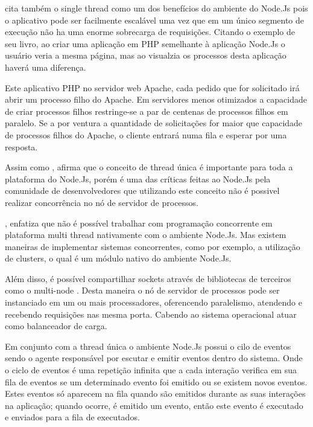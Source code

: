   \cite{Powers:2012} cita também o single thread como um dos benefícios do ambiente do Node.Js 
  pois o aplicativo pode ser facilmente escalável uma vez que em um único segmento de execução não ha uma enorme 
  sobrecarga de requisições. Citando o exemplo de seu livro, ao criar uma aplicação em \ac{PHP} semelhante 
  à aplicação Node.Js o usuário veria a mesma página, mas ao visualzia os processos desta aplicação haverá uma 
  diferença.
  
  Este aplicativo \ac{PHP} no servidor web Apache, cada pedido que for solicitado irá abrir um 
  processo filho do Apache. Em servidores menos otimizados a capacidade de criar processos filhos
  restringe-se a par de centenas de processos filhos em paralelo. Se a por ventura a quantidade de solicitações
  for maior que capacidade de processos filhos do Apache, o cliente entrará numa fila e esperar por uma resposta.\cite{Powers:2012}

  Assim como ,  afirma que o conceito de thread única é importante para 
  toda a plataforma do Node.Js, porém é uma das críticas feitas ao Node.Js pela comunidade de desenvolvedores 
  que utilizando este conceito não é possivel realizar concorrência no nó de servidor de processos.
  
  , enfatiza que não é possível trabalhar com programação 
  concorrente em plataforma multi thread nativamente com o ambiente Node.Js. Mas existem maneiras de implementar sistemas concorrentes, 
  como por exemplo, a utilização de clusters, o qual é um módulo nativo do ambiente Node.Js.
  
  Além disso, é possível compartilhar sockets através de bibliotecas de terceiros como o multi-node .
  Desta maneira o nó de servidor de processos pode ser instanciado em um ou mais processadores, oferencendo paralelismo, 
  atendendo e recebendo requisições nas mesma porta. Cabendo ao sistema operacional atuar como balanceador de carga.\cite{Oliveira:2012}
  
  Em conjunto com a thread única o ambiente Node.Js possui o cilo de eventos sendo o agente responsável por escutar e 
  emitir eventos dentro do sistema. Onde o ciclo de eventos é uma repetição infinita que a cada interação verifica em sua 
  fila de eventos se um determinado evento foi emitido ou se existem novos eventos. Estes eventos só aparecem na 
  fila quando são emitidos durante as suas interações na aplicação; quando ocorre, é emitido um evento, então este evento 
  é executado e enviados para a fila de executados.\cite{Pereira:2013}
  
